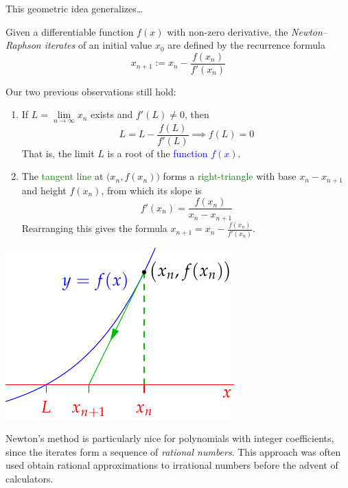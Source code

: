 \goodbreak


This geometric idea generalizes\ldots

\begin{defn}{}{}
	Given a differentiable function $f(x)$ with non-zero derivative, the \emph{Newton--Raphson iterates} of an initial value $x_0$ are defined by the recurrence formula
	\[
		x_{n+1}:=x_n-\frac{f(x_n)}{f'(x_n)}
	\]
\end{defn}

\begin{minipage}[t]{0.64\linewidth}\vspace{0pt}
	Our two previous observations still hold:
	\begin{enumerate}
	  \item If $L=\lim\limits_{n\to\infty}x_n$ exists and $f'(L)\neq 0$, then
	  \[
	  	L=L-\frac{f(L)}{f'(L)}\implies f(L)=0
	  \]
		That is, the limit $L$ is a root of the \textcolor{blue}{function $f(x)$}.
		\item The \textcolor{Green}{tangent line} at $\bigl(x_n,f(x_n)\bigr)$ forms a \textcolor{Green}{right-triangle} with base $x_n-x_{n+1}$ and height $f(x_n)$, from which its slope is
		\[
			f'(x_n)=\frac{f(x_n)}{x_n-x_{n+1}} %
		\]
		Rearranging this gives the formula $x_{n+1}=x_n-\frac{f(x_n)}{f'(x_n)}$.
	\end{enumerate}
\end{minipage}
\hfill
\begin{minipage}[t]{0.34\linewidth}\vspace{0pt}
	\flushright\includegraphics{newton-raphson3}
\end{minipage}\bigbreak

Newton's method is particularly nice for polynomials with integer coefficients, since the iterates form a sequence of \emph{rational numbers}. This approach was often used obtain rational approximations to irrational numbers before the advent of calculators.


